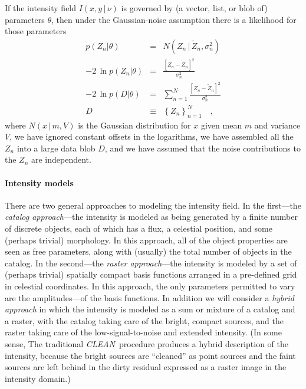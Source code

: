 \documentclass[12pt]{article}
\newcommand{\project}[1]{\textsl{#1}}
\newcommand{\CLEAN}{\project{CLEAN}}
\newcommand{\set}[1]{\left\{{#1}\right\}}
\newcommand{\given}{\,|\,}
\newcommand{\expectation}[1]{\tilde{#1}}
\newcommand{\normal}{N}
\begin{document}
If the intensity field $I(x,y\given\nu)$ is governed by (a vector,
list, or blob of) parameters $\theta$, then under the Gaussian-noise
assumption there is a likelihood for those parameters
\begin{eqnarray}
p(Z_n|\theta) &=& \normal(Z_n\given\expectation{Z}_n,\sigma_n^2)
\\
-2\,\ln p(Z_n|\theta) &=& \frac{[Z_n - \expectation{Z}_n]^2}{\sigma_n^2}
\\
-2\,\ln p(D|\theta) &=& \sum_{n=1}^N \frac{[Z_n - \expectation{Z}_n]^2}{\sigma_n^2}
\\
D &\equiv& \set{Z_n}_{n=1}^N
\quad ,
\end{eqnarray}
where $\normal(x\given m,V)$ is the Gaussian distribution for $x$
given mean $m$ and variance $V$, we have ignored constant offsets in
the logarithms, we have assembled all the $Z_n$ into a large data blob
$D$, and we have assumed that the noise contributions to the $Z_n$ are
independent.

\paragraph{Intensity models}

There are two general approaches to modeling the intensity field.  In
the first---the \emph{catalog approach}---the intensity is modeled as
being generated by a finite number of discrete objects, each of which
has a flux, a celestial position, and some (perhaps trivial)
morphology.  In this approach, all of the object properties are seen
as free parameters, along with (usually) the total number of objects
in the catalog.  In the second---the \emph{raster approach}---the
intensity is modeled by a set of (perhaps trivial) spatially compact
basis functions arranged in a pre-defined grid in celestial
coordinates.  In this approach, the only parameters permitted to vary
are the amplitudes---of the basis functions.  In addition we will
consider a \emph{hybrid approach} in which the intensity is modeled as
a sum or mixture of a catalog and a raster, with the catalog taking
care of the bright, compact sources, and the raster taking care of the
low-signal-to-noise and extended intensity.  (In some sense, The
traditional \CLEAN\ procedure produces a hybrid description of the
intensity, because the bright sources are ``cleaned'' as point sources
and the faint sources are left behind in the dirty residual expressed
as a raster image in the intensity domain.)
\end{document}
